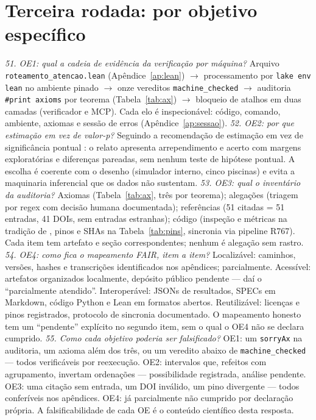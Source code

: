 \section{Terceira rodada: por objetivo específico}
\textit{51. OE1: qual a cadeia de evidência da verificação por máquina?} Arquivo \texttt{roteamento\_atencao.lean} (Apêndice~\ref{ap:lean}) $\to$ processamento por \texttt{lake env lean} no ambiente pinado $\to$ onze vereditos \texttt{machine\_checked} $\to$ auditoria \texttt{\#print axioms} por teorema (Tabela~\ref{tab:ax}) $\to$ bloqueio de atalhos em duas camadas (verificador e MCP). Cada elo é inspecionável: código, comando, ambiente, axiomas e sessão de erros (Apêndice~\ref{ap:sessao}).
\textit{52. OE2: por que estimação em vez de valor-\textit{p}?} Seguindo a recomendação de estimação em vez de significância pontual \cite{cumming2014,wasserstein2016}: o relato apresenta arrependimento e acerto com margens exploratórias e diferenças pareadas, sem nenhum teste de hipótese pontual. A escolha é coerente com o desenho (simulador interno, cinco piscinas) e evita a maquinaria inferencial que os dados não sustentam.
\textit{53. OE3: qual o inventário da auditoria?} Axiomas (Tabela~\ref{tab:ax}, três por teorema); alegações (triagem por regex com decisão humana documentada); referências (51 citadas = 51 entradas, 41 DOIs, sem entradas estranhas); código (inspeção e métricas na tradição de \cite{fagan1976,mccabe1976,chidamber1994}, pinos e SHAs na Tabela~\ref{tab:pins}, sincronia via pipeline R767). Cada item tem artefato e seção correspondentes; nenhum é alegação sem rastro.
\textit{54. OE4: como fica o mapeamento FAIR, item a item?} Localizável: caminhos, versões, hashes e transcrições identificados nos apêndices; parcialmente. Acessível: artefatos organizados localmente, depósito público pendente --- daí o ``parcialmente atendido''. Interoperável: JSONs de resultados, SPECs em Markdown, código Python e Lean em formatos abertos. Reutilizável: licenças e pinos registrados, protocolo de sincronia documentado. O mapeamento honesto tem um ``pendente'' explícito no segundo item, sem o qual o OE4 não se declara cumprido.
\textit{55. Como cada objetivo poderia ser falsificado?} OE1: um \texttt{sorryAx} na auditoria, um axioma além dos três, ou um veredito abaixo de \texttt{machine\_checked} --- todos verificáveis por reexecução. OE2: intervalos que, refeitos com agrupamento, invertam ordenações --- possibilidade registrada, análise pendente. OE3: uma citação sem entrada, um DOI inválido, um pino divergente --- todos conferíveis nos apêndices. OE4: já parcialmente não cumprido por declaração própria. A falsificabilidade de cada OE é o conteúdo científico desta resposta.
